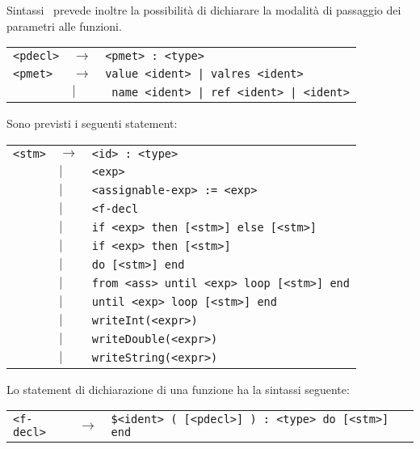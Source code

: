 \begin{section}{Sintassi}
	\ME \ prevede inoltre la possibilit\`a di dichiarare la modalit\`a
	di passaggio dei parametri alle funzioni.

	\begin{center} \begin{tabular} {lll}
		\texttt{<pdecl>} & $\rightarrow$ &
			\texttt{<pmet> : <type>} \\
		\texttt{<pmet>} & $\rightarrow$ &
			\texttt{value <ident> | valres <ident>} \\
		& $|$ & \texttt{ name <ident> | ref <ident> | <ident>} \\
	\end{tabular} \end{center}

	Sono previsti i seguenti statement:

	\begin{center} \begin{tabular} {lll}
		\texttt{<stm>} & $\rightarrow$ & 
		\texttt{<id> : <type>} \\
		 & $|$ & \texttt{<exp>} \\
		 & $|$ & \texttt{<assignable-exp> := <exp>} \\
		 & $|$ & \texttt{<f-decl} \\
		 & $|$ & \texttt{if <exp> then [<stm>] else [<stm>] } \\
		 & $|$ & \texttt{if <exp> then [<stm>] } \\
		 & $|$ & \texttt{do [<stm>] end} \\
		 & $|$ & \texttt{from <ass> until <exp> loop [<stm>] end} \\
		 & $|$ & \texttt{until <exp> loop [<stm>] end} \\
		 & $|$ & \texttt{writeInt(<expr>)} \\
		 & $|$ & \texttt{writeDouble(<expr>)} \\
		 & $|$ & \texttt{writeString(<expr>)} \\
	\end{tabular} \end{center}

	Lo statement di dichiarazione di una funzione ha la sintassi
	seguente:

	\begin{center} \begin{tabular} {lll}
		\texttt{<f-decl>} & $\rightarrow$ &
		\texttt{\$<ident> ( [<pdecl>] ) : <type> do [<stm>] end}
	\end{tabular} \end{center}


\end{section}
